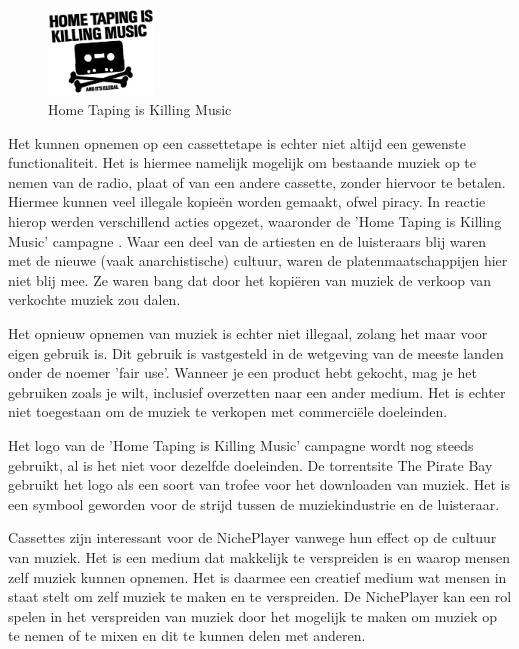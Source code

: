\begin{figure}
    \centering
    \includegraphics[width=0.25\textwidth]{assets/critical-review/Home_taping_is_killing_music.png}
    \caption{Home Taping is Killing Music}
    \label{fig:critical-review:home_taping_is_killing_music}
\end{figure}
Het kunnen opnemen op een cassettetape is echter niet altijd een gewenste functionaliteit. Het is hiermee namelijk mogelijk om bestaande muziek op te nemen van de radio, plaat of van een andere cassette, zonder hiervoor te betalen. Hiermee kunnen veel illegale kopieën worden gemaakt, ofwel piracy. In reactie hierop werden verschillend acties opgezet, waaronder de 'Home Taping is Killing Music' campagne \cite{bottomley2015home}. Waar een deel van de artiesten en de luisteraars blij waren met de nieuwe (vaak anarchistische) cultuur, waren de platenmaatschappijen hier niet blij mee. Ze waren bang dat door het kopiëren van muziek de verkoop van verkochte muziek zou dalen.

Het opnieuw opnemen van muziek is echter niet illegaal, zolang het maar voor eigen gebruik is. Dit gebruik is vastgesteld in de wetgeving van de meeste landen onder de noemer 'fair use'. Wanneer je een product hebt gekocht, mag je het gebruiken zoals je wilt, inclusief overzetten naar een ander medium. Het is echter niet toegestaan om de muziek te verkopen met commerciële doeleinden.

Het logo van de 'Home Taping is Killing Music' campagne wordt nog steeds gebruikt, al is het niet voor dezelfde doeleinden. De torrentsite The Pirate Bay gebruikt het logo als een soort van trofee voor het downloaden van muziek. Het is een symbool geworden voor de strijd tussen de muziekindustrie en de luisteraar.

Cassettes zijn interessant voor de NichePlayer vanwege hun effect op de cultuur van muziek. Het is een medium dat makkelijk te verspreiden is en waarop mensen zelf muziek kunnen opnemen. Het is daarmee een creatief medium wat mensen in staat stelt om zelf muziek te maken en te verspreiden. De NichePlayer kan een rol spelen in het verspreiden van muziek door het mogelijk te maken om muziek op te nemen of te mixen en dit te kunnen delen met anderen.

